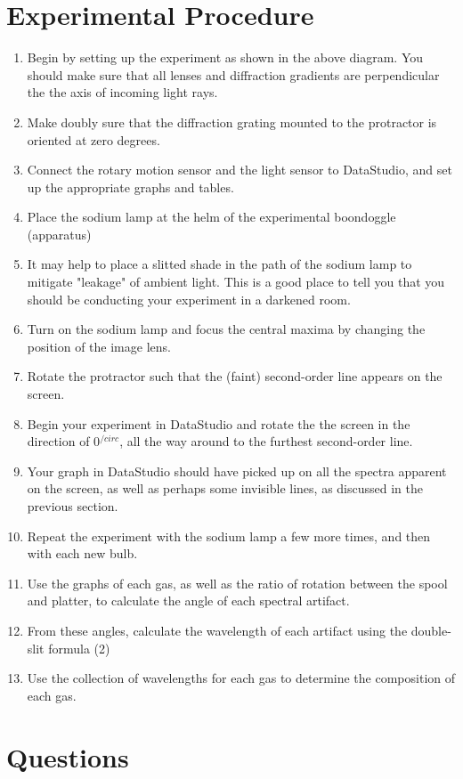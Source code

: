 \documentclass[11.8pt]{amsart}
\begin{document}
\section{Experimental Procedure}
\begin{enumerate}
\item Begin by setting up the experiment as shown in the above diagram. You should make sure that all lenses and diffraction gradients are perpendicular the the axis of incoming light rays.
\item Make doubly sure that the diffraction grating mounted to the protractor is oriented at zero degrees.
\item Connect the rotary motion sensor and the light sensor to DataStudio, and set up the appropriate graphs and tables.
\item Place the sodium lamp at the helm of the experimental boondoggle (apparatus)
\item It may help to place a slitted shade in the path of the sodium lamp to mitigate "leakage" of ambient light. This is a good place to tell you that you should be conducting your experiment in a darkened room.
\item Turn on the sodium lamp and focus the central maxima by changing the position of the image lens.
\item Rotate the protractor such that the (faint) second-order line appears on the screen.
\item Begin your experiment in DataStudio and rotate the the screen in the direction of 0$^{/circ}$, all the way around to the furthest second-order line.
\item Your graph in DataStudio should have picked up on all the spectra apparent on the screen, as well as perhaps some invisible lines, as discussed in the previous section.
\item Repeat the experiment with the sodium lamp a few more times, and then with each new bulb.
\item Use the graphs of each gas, as well as the ratio of rotation between the spool and platter, to calculate the angle of each spectral artifact.
\item From these angles, calculate the wavelength of each artifact using the double-slit formula (2)
\item Use the collection of wavelengths for each gas to determine the composition of each gas.
\end{enumerate}
\vfill
\section{Questions}
\end{document}
